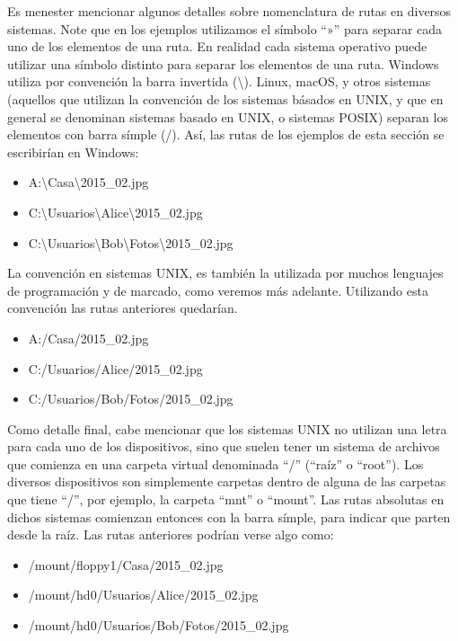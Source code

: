 Es menester mencionar algunos detalles sobre nomenclatura de rutas
en diversos sistemas. Note que en los ejemplos utilizamos el símbolo ``»'' para
separar cada uno de los elementos de una ruta. En realidad cada sistema operativo
puede utilizar una símbolo distinto para separar los elementos de una ruta.
Windows utiliza por convención la barra invertida (\textbackslash). Linux,
macOS, y otros sistemas (aquellos que utilizan la convención de los sistemas
básados en UNIX, y que en general se denominan sistemas basado en UNIX, o sistemas
POSIX) separan los elementos con barra símple (/). Así, las rutas de los ejemplos
de esta sección se escribirían en Windows:
\begin{itemize}
    \item A:\textbackslash Casa\textbackslash 2015\_02.jpg
    \item C:\textbackslash Usuarios\textbackslash Alice\textbackslash 2015\_02.jpg
    \item C:\textbackslash Usuarios\textbackslash Bob\textbackslash Fotos\textbackslash 2015\_02.jpg
\end{itemize}

La convención en sistemas UNIX, es también la utilizada por muchos lenguajes de
programación y de marcado, como veremos más adelante. Utilizando esta convención
las rutas anteriores quedarían.
\begin{itemize}
    \item A:/Casa/2015\_02.jpg
    \item C:/Usuarios/Alice/2015\_02.jpg
    \item C:/Usuarios/Bob/Fotos/2015\_02.jpg
\end{itemize}

Como detalle final, cabe mencionar que los sistemas UNIX no utilizan una letra
para cada uno de los dispositivos, sino que suelen tener un sistema de archivos
que comienza en una carpeta virtual denominada ``/'' (``raíz'' o ``root'').
Los diversos dispositivos son simplemente carpetas dentro de alguna de las
carpetas que tiene ``/'', por ejemplo, la carpeta ``mnt'' o ``mount''. Las rutas
absolutas en dichos sistemas comienzan entonces con la barra símple, para indicar
que parten desde la raíz. Las rutas anteriores podrían verse algo como:
\begin{itemize}
    \item /mount/floppy1/Casa/2015\_02.jpg
    \item /mount/hd0/Usuarios/Alice/2015\_02.jpg
    \item /mount/hd0/Usuarios/Bob/Fotos/2015\_02.jpg
\end{itemize}

